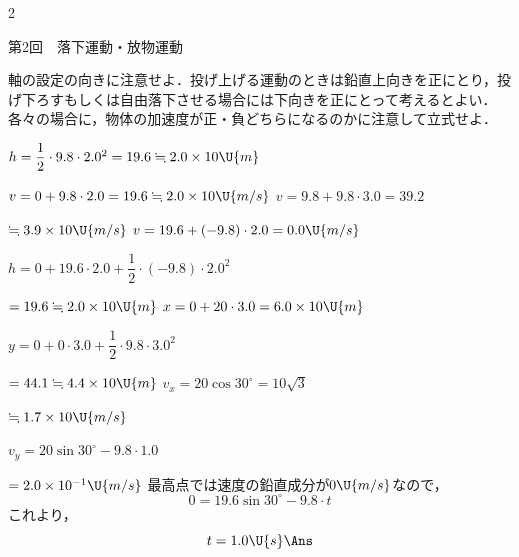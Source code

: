 \newpage

\setlength{\columnseprule}{0.4pt}
\begin{multicols}{2}
\raggedcolumns

{\gtfamily\large 第2回　落下運動・放物運動}\par\vspace{2mm}

\par\nopagebreak
\begin{sisin}
軸の設定の向きに注意せよ．投げ上げる運動のときは鉛直上向きを正にとり，投げ下ろすもしくは自由落下させる場合には下向きを正にとって考えるとよい．各々の場合に，物体の加速度が正・負どちらになるのかに注意して立式せよ．
\end{sisin}
\par\nopagebreak
\begin{komon}
 $h=\dfrac{1}{2}\cdot 9.8\cdot 2.0^2=19.6\fallingdotseq 2.0\times 10\U{m}$\Ans\par
       $v=0+9.8\cdot 2.0=19.6\fallingdotseq 2.0\times 10\U{m/s}$\Ans
{} $v=9.8+9.8\cdot 3.0=39.2$\par
       \hspace*{1zw}$\fallingdotseq 3.9\times 10\U{m/s}$\Ans
{} $v=19.6+(-9.8)\cdot 2.0=0.0\U{m/s}$\Ans\par
       $h=0+19.6\cdot 2.0+\dfrac{1}{2}\cdot(-9.8)\cdot 2.0^2$\par
       \hspace*{1zw}$=19.6\fallingdotseq 2.0\times 10\U{m}$\Ans
{} $x=0+20\cdot 3.0=6.0\times 10\U{m}$\Ans\par
       $y=0+0\cdot 3.0+\dfrac{1}{2}\cdot 9.8\cdot 3.0^2$\par
       \hspace*{1zw}$=44.1\fallingdotseq 4.4\times 10\U{m}$\Ans
{} $v_x=20\cos 30^\circ=10\sqrt{3}$\par
       \hspace*{1zw}$\fallingdotseq 1.7\times 10\U{m/s}$\Ans\par
       $v_y=20\sin 30^\circ-9.8\cdot 1.0$\par
       \hspace*{1zw}$=2.0\times 10^{-1}\U{m/s}$\Ans
{} 最高点では速度の鉛直成分が$0\U{m/s}$なので，
       \[0=19.6\sin 30^\circ-9.8\cdot t\]
       これより，
       \[t=1.0\U{s}\Ans\]
\end{komon}


\end{multicols}
